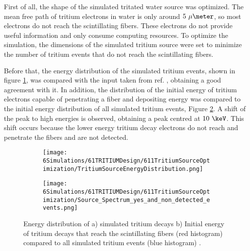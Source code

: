 First of all, the shape of the simulated tritated water source was optimized. The mean free path of tritium electrons in water is only around $5~\mu\meter$, so most electrons do not reach the scintillating fibers. These electrons do not provide useful information and only consume computing resources. To optimize the simulation, the dimensions of the simulated tritium source were set to minimize the number of tritium events that do not reach the scintillating fibers. 

Before that, the energy distribution of the simulated tritium events, shown in figure \ref{subfig:EnergyDistributionTritiumSource}, was compared with the input taken from ref. \cite{TritiumEmissionSpectrum}, obtaining a good agreement with it. In addition, the distribution of the initial energy of tritium electrons capable of penetrating a fiber and depositing energy was compared to the initial energy distribution of all simulated tritium events, Figure \ref{subfig:EnergySpectrumEventsDetectedandNonDetected}. A shift of the peak to high energies is observed, obtaining a peak centred at $10~\keV$. This shift occurs because the lower energy tritium decay electrons do not reach and penetrate the fibers and are not detected.

\begin{figure}
\centering
    \begin{subfigure}[b]{0.45\textwidth}
    \centering
    \texttt{[image: 6Simulations/61TRITIUMDesign/611TritiumSourceOptimization/TritiumSourceEnergyDistribution.png]}  
    \caption{\label{subfig:EnergyDistributionTritiumSource}}
    \end{subfigure}
    \hfill
    \begin{subfigure}[b]{0.45\textwidth}
    \centering
    \texttt{[image: 6Simulations/61TRITIUMDesign/611TritiumSourceOptimization/Source\_Spectrum\_yes\_and\_non\_detected\_events.png]}  
    \caption{\label{subfig:EnergySpectrumEventsDetectedandNonDetected}}
    \end{subfigure}
 \caption{Energy distribution of a) simulated tritium decays b) Initial energy of tritium decays that reach the scintillating fibers (red histogram) compared to all simulated tritium events (blue histogram) \cite{SimulationPaperCarlos}.
 \label{fig:TritiumSourceOptimization}}
\end{figure}


